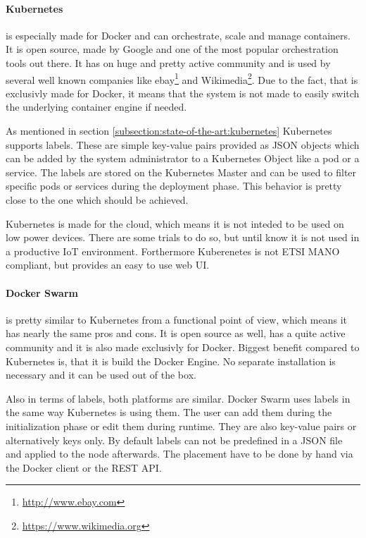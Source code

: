 \paragraph{Kubernetes} is especially made for Docker and can orchestrate, scale and manage containers.
It is open source, made by Google and one of the most popular orchestration tools out there.
It has on huge and pretty active community and is used by several well known companies\autocite{Kubernetes:Case-Studies} like ebay\footnote{\url{http://www.ebay.com}} and Wikimedia\footnote{\url{https://www.wikimedia.org}}.
Due to the fact, that is exclusivly made for Docker, it means that the system is not made to easily switch the underlying container engine if needed.

As mentioned in section \ref{subsection:state-of-the-art:kubernetes} Kubernetes supports labels.
These are simple key-value pairs provided as \ac{JSON} objects which can be added by the system administrator to a Kubernetes Object like a pod or a service.
The labels are stored on the Kubernetes Master and can be used to filter specific pods or services during the deployment phase.
This behavior is pretty close to the one which should be achieved.

Kubernetes is made for the cloud, which means it is not inteded to be used on low power devices.
There are some trials to do so, but until know it is not used in a productive \ac{IoT} environment.
Forthermore Kuberenetes is not \ac{ETSI} \ac{MANO} compliant, but provides an easy to use web \ac{UI}.

\paragraph{Docker Swarm} is pretty similar to Kubernetes from a functional point of view, which means it has nearly the same pros and cons.
It is open source as well, has a quite active community and it is also made exclusivly for Docker.
Biggest benefit compared to Kubernetes is, that it is build the Docker Engine.
No separate installation is necessary and it can be used out of the box.

Also in terms of labels, both platforms are similar.
Docker Swarm uses labels in the same way Kubernetes is using them.
The user can add them during the initialization phase or edit them during runtime.
They are also key-value pairs or alternatively keys only.
By default labels can not be predefined in a \ac{JSON} file and applied to the node afterwards.
The placement have to be done by hand via the Docker client or the \ac{REST} \ac{API}.

